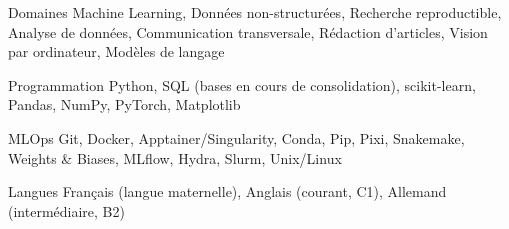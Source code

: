 

\begin{cvskills}

  \cvskill
    {Domaines} %
    {Machine Learning, Données non-structurées, Recherche reproductible, Analyse de données, Communication transversale, Rédaction d'articles, Vision par ordinateur, Modèles de langage} %

  \cvskill
    {Programmation} %
    {Python, SQL (bases en cours de consolidation), scikit-learn, Pandas, NumPy, PyTorch, Matplotlib} %

  \cvskill
    {MLOps} %
    {Git, Docker, Apptainer/Singularity, Conda, Pip, Pixi, Snakemake, Weights \& Biases, MLflow, Hydra, Slurm, Unix/Linux} %

  \cvskill
    {Langues} %
    {Français (langue maternelle), Anglais (courant, C1), Allemand (intermédiaire, B2)} %

\end{cvskills}
